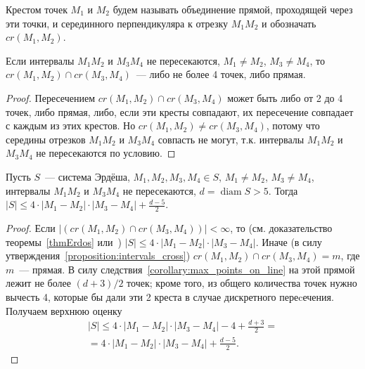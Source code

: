 \begin{definition}
	Крестом точек $M_1$ и $M_2$ будем называть объединение прямой,
	проходящей через эти точки,
	и серединного перпендикуляра к отрезку $M_1 M_2$
	и обозначать $cr(M_1,M_2)$.
\end{definition}

\begin{proposition}
	\label{proposition:intervals_cross}
	Если интервалы $M_1 M_2$ и $M_3 M_4$ не пересекаются,
	$M_1 \neq M_2$, $M_3 \neq M_4$,
	то $cr(M_1,M_2) \cap cr(M_3,M_4)$~--- либо не более 4 точек, либо прямая.
\end{proposition}

\begin{proof}
	Пересечением $cr(M_1,M_2) \cap cr(M_3,M_4)$ может быть либо от 2 до 4 точек, либо прямая,
	либо, если эти кресты совпадают, их пересечение совпадает с каждым из этих крестов.
	Но $cr(M_1,M_2) \neq cr(M_3,M_4)$, потому что середины отрезков $M_1 M_2$ и $M_3 M_4$
	совпасть не могут, т.к. интервалы $M_1 M_2$ и $M_3 M_4$ не пересекаются по условию.
\end{proof}

\begin{lemma}
	\label{lemma_preliminary_size}
	Пусть $S$~--- система Эрдёша,
	$M_1, M_2, M_3, M_4 \in S$,
	$M_1 \neq M_2$, $M_3 \neq M_4$,
	интервалы $M_1 M_2$ и $M_3 M_4$ не пересекаются,
	$d = \operatorname{diam} S > 5$.
	Тогда $|S| \leq 4 \cdot |M_1 - M_2| \cdot |M_3 - M_4| + \frac{d-5}{2}$.
\end{lemma}

\begin{proof}
	Если $|(cr(M_1, M_2) \cap cr(M_3, M_4))| < \infty$,
	то (см. доказательство теоремы~\ref{thmErdos} или~\cite[часть 2, неравенство (1)]{solymosi2003note})
	$|S| \leq 4 \cdot |M_1 - M_2| \cdot |M_3 - M_4|$.
	Иначе (в силу утверждения~\ref{proposition:intervals_cross}) $cr(M_1, M_2) \cap cr(M_3, M_4) = m$,
	где $m$~--- прямая.
	В силу следствия~\ref{corollary:max_points_on_line} на этой прямой лежит не более $(d+3)/2$ точек;
	кроме того, из общего количества точек нужно вычесть 4,
	которые бы дали эти 2 креста в случае дискретного переcечения.
	Получаем верхнюю оценку
	\begin{multline}
		|S| \leq 4 \cdot |M_1 - M_2| \cdot |M_3 - M_4| - 4 + \frac{d+3}{2}
		=
		\\=
		4 \cdot |M_1 - M_2| \cdot |M_3 - M_4| + \frac{d-5}{2}
		.
	\end{multline}
\end{proof}

